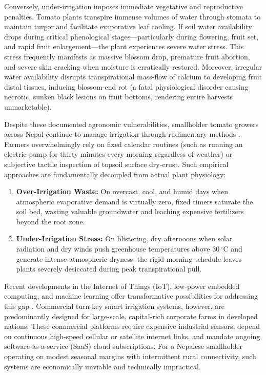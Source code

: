 \documentclass[12pt, a4paper]{article}
\begin{document}
Conversely, under-irrigation imposes immediate vegetative and reproductive penalties. Tomato plants transpire immense volumes of water through stomata to maintain turgor and facilitate evaporative leaf cooling. If soil water availability drops during critical phenological stages—particularly during flowering, fruit set, and rapid fruit enlargement—the plant experiences severe water stress. This stress frequently manifests as massive blossom drop, premature fruit abortion, and severe skin cracking when moisture is erratically restored. Moreover, irregular water availability disrupts transpirational mass-flow of calcium to developing fruit distal tissues, inducing blossom-end rot (a fatal physiological disorder causing necrotic, sunken black lesions on fruit bottoms, rendering entire harvests unmarketable).

Despite these documented agronomic vulnerabilities, smallholder tomato growers across Nepal continue to manage irrigation through rudimentary methods \citep{kunwar2024}. Farmers overwhelmingly rely on fixed calendar routines (such as running an electric pump for thirty minutes every morning regardless of weather) or subjective tactile inspection of topsoil surface dry-crust. Such empirical approaches are fundamentally decoupled from actual plant physiology:
\begin{enumerate}[leftmargin=1.2cm, itemsep=2pt]
    \item \textbf{Over-Irrigation Waste:} On overcast, cool, and humid days when atmospheric evaporative demand is virtually zero, fixed timers saturate the soil bed, wasting valuable groundwater and leaching expensive fertilizers beyond the root zone.
    \item \textbf{Under-Irrigation Stress:} On blistering, dry afternoons when solar radiation and dry winds push greenhouse temperatures above 30\,$^{\circ}$C and generate intense atmospheric dryness, the rigid morning schedule leaves plants severely desiccated during peak transpirational pull.
\end{enumerate}

Recent developments in the Internet of Things (IoT), low-power embedded computing, and machine learning offer transformative possibilities for addressing this gap \citep{rajpoot2022,singha2025}. Commercial turn-key smart irrigation systems, however, are predominantly designed for large-scale, capital-rich corporate farms in developed nations. These commercial platforms require expensive industrial sensors, depend on continuous high-speed cellular or satellite internet links, and mandate ongoing software-as-a-service (SaaS) cloud subscriptions. For a Nepalese smallholder operating on modest seasonal margins with intermittent rural connectivity, such systems are economically unviable and technically impractical.
\end{document}
